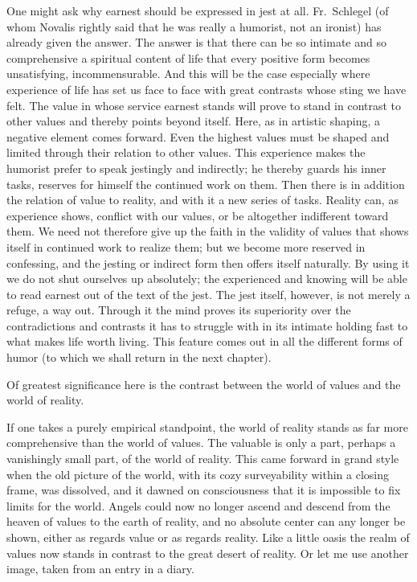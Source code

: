\documentclass[12pt]{book}
\newcommand{\opage}[1]{\marginnote{\footnotesize\textit{[#1]}}}
\begin{document}
One might ask why earnest should be expressed in jest at all. Fr.~Schlegel (of whom
Novalis rightly said that he was really a humorist, not an ironist) has already given
the answer. The answer is that there can be so intimate and so comprehensive a
spiritual content of life that every positive form becomes unsatisfying,
incommensurable. And this will be the case especially where experience of life has
set us face to face with great contrasts whose sting we have felt. The value in whose
service earnest stands will prove to stand in contrast to other values and thereby
points beyond itself. Here, as in artistic shaping, a negative element comes forward.
Even the highest values must be shaped and limited through their relation to other
values. This experience makes the \opage{70}humorist prefer to speak jestingly and
indirectly; he thereby guards his inner tasks, reserves for himself the continued work
on them. Then there is in addition the relation of value to reality, and with it a new
series of tasks. Reality can, as experience shows, conflict with our values, or be
altogether indifferent toward them. We need not therefore give up the faith in the
validity of values that shows itself in continued work to realize them; but we become
more reserved in confessing, and the jesting or indirect form then offers itself
naturally. By using it we do not shut ourselves up absolutely; the experienced and
knowing will be able to read earnest out of the text of the jest. The jest itself,
however, is not merely a refuge, a way out. Through it the mind proves its
superiority over the contradictions and contrasts it has to struggle with in its
intimate holding fast to what makes life worth living. This feature comes out in all
the different forms of humor (to which we shall return in the next chapter).

Of greatest significance here is the contrast between the world of values and the
world of reality.

If one takes a purely empirical standpoint, the world of reality stands as far more
comprehensive than the world of values. The valuable is only a part, perhaps a
vanishingly small part, of the world of reality. This came forward in grand style
when the old picture of the world, with its cozy surveyability within a closing frame,
was dissolved, and it dawned on consciousness that it is impossible to fix limits for
the world. Angels could now no longer ascend and descend from the heaven of values to
the earth of reality, and no absolute center can any longer be shown, either as
regards value or as regards reality. Like a little oasis the realm of values now
stands in contrast to the great desert of reality. Or let me use another image, taken
from an entry in a diary.
\end{document}
